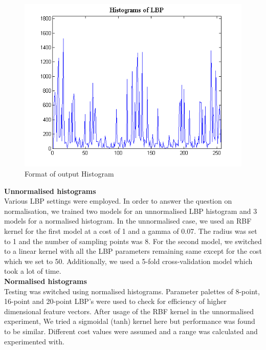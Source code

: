 \documentclass[preprint,12pt]{elsarticle}
\begin{document}
\begin{figure}[h]
\centering\includegraphics[width=0.85\linewidth]{demo_mlhmslbp_spyr_02}
\caption{Format of output Histogram}
\end{figure}
\textbf{Unnormalised histograms}\\

Various LBP settings were employed. In order to answer the question on normalisation, we trained two models for an unnormalised LBP histogram and 3 models for a normalised histogram. In the unnormalised case, we used an RBF kernel for the first model at a cost of 1 and a gamma of 0.07. The radius was set to 1 and the number of sampling points was 8. For the second model, we switched to a linear kernel with all the LBP parameters remaining same except for the cost which we set to 50. Additionally, we used a 5-fold cross-validation model which took a lot of time.\\

\textbf{Normalised histograms}\\

Testing was switched using normalised histograms. Parameter palettes of 8-point, 16-point and 20-point LBP's were used to check for efficiency of higher dimensional feature vectors. After usage of the RBF kernel in the unnormalised experiment, We tried a sigmoidal (tanh) kernel here but performance was found to be similar. Different cost values were assumed and a range was calculated and experimented with.\\
\end{document}
